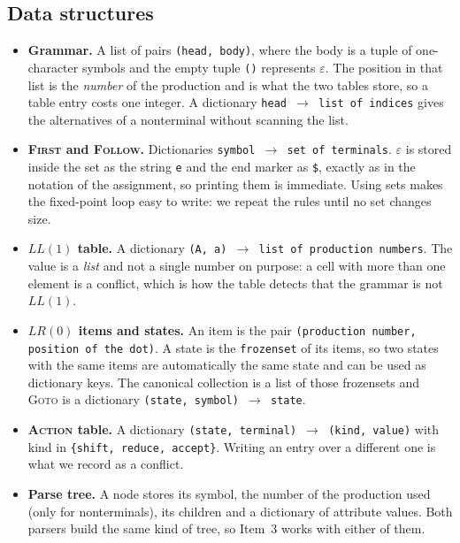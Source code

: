 \documentclass[11pt]{article}
\newcommand{\first}{\textsc{First}}
\newcommand{\follow}{\textsc{Follow}}
\newcommand{\gotofn}{\textsc{Goto}}
\begin{document}
\subsection{Data structures}

\begin{itemize}
  \item \textbf{Grammar.} A list of pairs \texttt{(head, body)}, where the body is a
        tuple of one-character symbols and the empty tuple \texttt{()} represents
        $\varepsilon$. The position in that list is the \emph{number} of the production
        and is what the two tables store, so a table entry costs one integer. A
        dictionary \texttt{head $\rightarrow$ list of indices} gives the alternatives of
        a nonterminal without scanning the list.

  \item \textbf{\first{} and \follow{}.} Dictionaries \texttt{symbol $\rightarrow$ set of
        terminals}. $\varepsilon$ is stored inside the set as the string \texttt{e} and
        the end marker as \texttt{\$}, exactly as in the notation of the assignment, so
        printing them is immediate. Using sets makes the fixed-point loop easy to write:
        we repeat the rules until no set changes size.

  \item \textbf{$LL(1)$ table.} A dictionary \texttt{(A, a) $\rightarrow$ list of
        production numbers}. The value is a \emph{list} and not a single number on
        purpose: a cell with more than one element is a conflict, which is how the table
        detects that the grammar is not $LL(1)$.

  \item \textbf{$LR(0)$ items and states.} An item is the pair
        \texttt{(production number, position of the dot)}. A state is the
        \texttt{frozenset} of its items, so two states with the same items are
        automatically the same state and can be used as dictionary keys. The canonical
        collection is a list of those frozensets and \gotofn{} is a dictionary
        \texttt{(state, symbol) $\rightarrow$ state}.

  \item \textbf{\textsc{Action} table.} A dictionary
        \texttt{(state, terminal) $\rightarrow$ (kind, value)} with kind in
        \texttt{\{shift, reduce, accept\}}. Writing an entry over a different one is
        what we record as a conflict.

  \item \textbf{Parse tree.} A node stores its symbol, the number of the production used
        (only for nonterminals), its children and a dictionary of attribute values. Both
        parsers build the same kind of tree, so Item~3 works with either of them.


\end{itemize}
\end{document}
